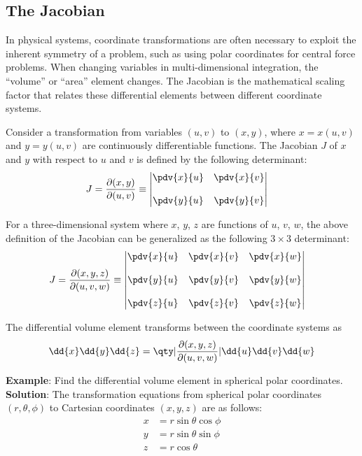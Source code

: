 	\subsection{The Jacobian}
		In physical systems, coordinate transformations are often necessary to exploit the inherent symmetry of a problem, such as using polar coordinates for central force problems. When changing variables in multi-dimensional integration, the ``volume'' or ``area'' element changes. The Jacobian is the mathematical scaling factor that relates these differential elements between different coordinate systems.
		
		Consider a transformation from variables $(u, v)$ to $(x, y)$, where $x = x(u, v)$ and $y = y(u, v)$ are continuously differentiable functions. The Jacobian $J$ of $x$ and $y$ with respect to $u$ and $v$ is defined by the following determinant:
		\begin{align*}
			J=\dfrac{\partial(x,y)}{\partial(u,v)}&\equiv\begin{vmatrix}
				{\pdv{x}{u}} & {\pdv{x}{v}} \\
				{} & {} \\
				{\pdv{y}{u}} & {\pdv{y}{v}}
			\end{vmatrix}
		\end{align*}
		
		For a three-dimensional system where $x$, $y$, $z$ are functions of $u$, $v$, $w$, the above definition of the Jacobian can be generalized as the following $3\times 3$ determinant:
			\begin{align*}
			J=\dfrac{\partial(x,y,z)}{\partial(u,v,w)}&\equiv\begin{vmatrix}
				{\pdv{x}{u}} & {\pdv{x}{v}} & {\pdv{x}{w}} \\
				{} & {} & {} \\
				{\pdv{y}{u}} & {\pdv{y}{v}} & {\pdv{y}{w}} \\
				{} & {} & {} \\
				{\pdv{z}{u}} & {\pdv{z}{v}} & {\pdv{z}{w}}
			\end{vmatrix}
		\end{align*}
		
		The differential volume element transforms between the coordinate systems as
		\begin{align*}
			\dd{x}\dd{y}\dd{z}=\qty|\dfrac{\partial(x,y,z)}{\partial(u,v,w)}|\dd{u}\dd{v}\dd{w}
		\end{align*}
		
		\textbf{Example}: Find the differential volume element in spherical polar coordinates.\\
		\textbf{Solution}: The transformation equations from spherical polar coordinates $(r,\theta,\phi)$ to Cartesian coordinates $(x,y,z)$ are as follows:
		\begin{align*}
			x&=r\sin{\theta}\cos{\phi} \\
			y&=r\sin{\theta}\sin{\phi} \\
			z&=r\cos{\theta}
		\end{align*}
		
